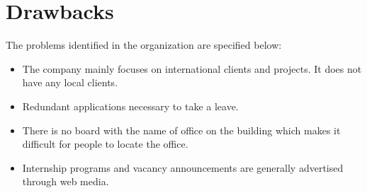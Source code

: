 \section{Drawbacks}
The problems identified in the organization are specified below:
\begin{itemize}
\item The company mainly focuses on international clients and projects. It does not have any local clients.
\item Redundant applications necessary to take a leave.
\item There is no board with the name of office on the building which makes it difficult for people to locate
the office.
\item Internship programs and vacancy announcements are generally advertised through web media.
\end{itemize}
\cleardoublepage

